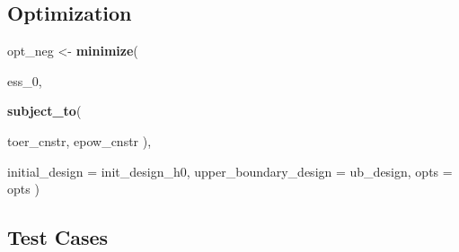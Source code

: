 \documentclass[]{book}
\newenvironment{Shaded}{\begin{snugshade}}{\end{snugshade}}
\newcommand{\DataTypeTok}[1]{\textcolor[rgb]{0.13,0.29,0.53}{#1}}
\newcommand{\DecValTok}[1]{\textcolor[rgb]{0.00,0.00,0.81}{#1}}
\newcommand{\FloatTok}[1]{\textcolor[rgb]{0.00,0.00,0.81}{#1}}
\newcommand{\KeywordTok}[1]{\textcolor[rgb]{0.13,0.29,0.53}{\textbf{#1}}}
\newcommand{\NormalTok}[1]{#1}
\newcommand{\OperatorTok}[1]{\textcolor[rgb]{0.81,0.36,0.00}{\textbf{#1}}}
\newcommand{\StringTok}[1]{\textcolor[rgb]{0.31,0.60,0.02}{#1}}
\begin{document}
\begin{Shaded}
\end{Shaded}

\hypertarget{optimization-4}{%
\subsection{Optimization}\label{optimization-4}}

\begin{Shaded}
\begin{Highlighting}[]
\NormalTok{opt_neg <-}\StringTok{ }\KeywordTok{minimize}\NormalTok{(}
  
\NormalTok{        ess_}\DecValTok{0}\NormalTok{,}
        
        \KeywordTok{subject_to}\NormalTok{(}
          
\NormalTok{            toer_cnstr,}
\NormalTok{            epow_cnstr}
\NormalTok{        ),}
        
        \DataTypeTok{initial_design =}\NormalTok{ init_design_h0,}
        \DataTypeTok{upper_boundary_design =}\NormalTok{ ub_design,}
        \DataTypeTok{opts =}\NormalTok{ opts}
\NormalTok{)}
\end{Highlighting}
\end{Shaded}

\hypertarget{test-cases-4}{%
\subsection{Test Cases}\label{test-cases-4}}
\end{document}
